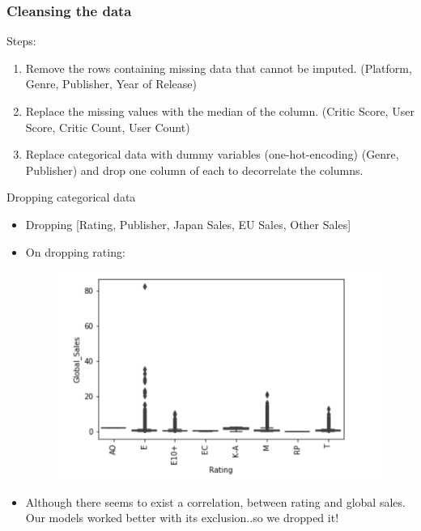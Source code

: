 \begin{frame}
    \frametitle{Cleansing the data}
    Steps:
    \begin{enumerate}
    \item Remove the rows containing missing data that cannot be imputed. (Platform, Genre, Publisher, Year of Release)
    
    \item Replace the missing values with the median of the column. (Critic Score, User Score, Critic Count, User Count)
    \item Replace categorical data with dummy variables (one-hot-encoding) (Genre, Publisher) and drop one column of each to decorrelate the columns. 
    
    \end{enumerate}
\end{frame}
\begin{frame}{Dropping categorical data}
    \begin{itemize}
        \item Dropping [Rating, Publisher, Japan Sales, EU Sales, Other Sales]
        
        \item On dropping rating: 
        \begin{figure}[H]
        \centering
        \includegraphics[scale=0.5]{graphs/rating.png}
        
    \end{figure}
    \item 
    Although there seems to exist a correlation, between rating and global sales. Our models worked better with its exclusion..so we dropped it!
    \end{itemize}
\end{frame}

